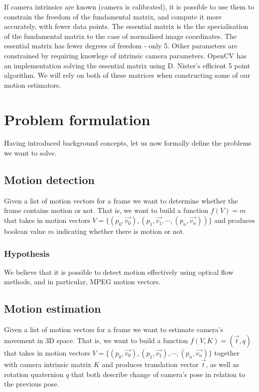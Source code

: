 \documentclass[11pt,english]{report}
\begin{document}
If camera intrinsics are known (camera is calibrated), it is possible to use them to constrain the freedom of the fundamental matrix, and compute it more accurately, with fewer data points. The essential matrix is the the specialisation of the fundamental matrix to the case of normalised image coordinates\cite{hartley_zisserman_2004}. The essential matrix has fewer degrees of freedom - only 5. Other parameters are constrained by requiring knowlege of intrinsic camera parameters. OpenCV has an implementation solving the essential matrix using D. Nister's efficient 5 point algorithm\cite{1211470}. We will rely on both of these matrices when constructing some of our motion estimators.

\section{Problem formulation}

Having introduced background concepts, let us now formally define the problems we want to solve.

\subsection{Motion detection}

Given a list of motion vectors for a frame we want to determine whether the frame contains motion or not. That is, we want to build a function $f(V) = m$ that takes in motion vectors $V = \{(p_0, \overrightarrow{v_0}), (p_1, \overrightarrow{v_1}, \cdots, (p_n, \overrightarrow{v_n}))\}$ and produces boolean value $m$ indicating whether there is motion or not.

\subsubsection{Hypothesis}

We believe that it is possible to detect motion effectively using optical flow methods, and in particular, MPEG motion vectors.

\subsection{Motion estimation}

Given a list of motion vectors for a frame we want to estimate camera's movement in 3D space. That is, we want to build a function $f(V, K) = (\overrightarrow{t}, q)$ that takes in motion vectors $V = \{(p_0, \overrightarrow{v_0}), (p_1, \overrightarrow{v_1}), \cdots, (p_n, \overrightarrow{v_n})\}$ together with camera intrinsic matrix $K$ and produces translation vector $\overrightarrow{t}$, as well as rotation quaternion $q$ that both describe change of camera's pose in relation to the previous pose.
\end{document}
